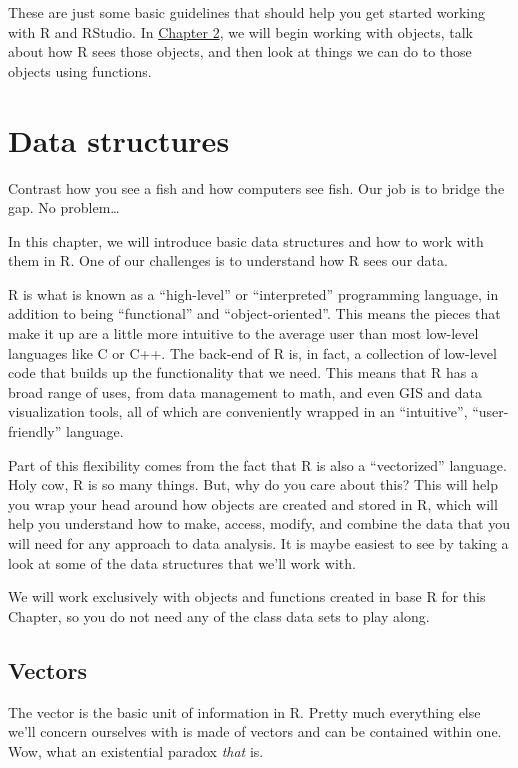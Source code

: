 \documentclass[
]{book}
\begin{document}
These are just some basic guidelines that should help you get started working with R and RStudio. In \protect\hyperlink{data_struc}{Chapter 2}, we will begin working with objects, talk about how R sees those objects, and then look at things we can do to those objects using functions.

\hypertarget{Chapter2}{%
\chapter{Data structures}\label{Chapter2}}

Contrast how you see a fish and how computers see fish. Our job is to bridge the gap. No problem\ldots{}

In this chapter, we will introduce basic data structures and how to work with them in R. One of our challenges is to understand how R sees our data.

R is what is known as a ``high-level'' or ``interpreted'' programming language, in addition to being ``functional'' and ``object-oriented''. This means the pieces that make it up are a little more intuitive to the average user than most low-level languages like C or C++. The back-end of R is, in fact, a collection of low-level code that builds up the functionality that we need. This means that R has a broad range of uses, from data management to math, and even GIS and data visualization tools, all of which are conveniently wrapped in an ``intuitive'', ``user-friendly'' language.

Part of this flexibility comes from the fact that R is also a ``vectorized'' language. Holy cow, R is so many things. But, why do you care about this? This will help you wrap your head around how objects are created and stored in R, which will help you understand how to make, access, modify, and combine the data that you will need for any approach to data analysis. It is maybe easiest to see by taking a look at some of the data structures that we'll work with.

We will work exclusively with objects and functions created in base R for this Chapter, so you do not need any of the class data sets to play along.

\hypertarget{vectors}{%
\section{Vectors}\label{vectors}}

The vector is the basic unit of information in R. Pretty much everything else we'll concern ourselves with is made of vectors and can be contained within one. Wow, what an existential paradox \emph{that} is.
\end{document}
